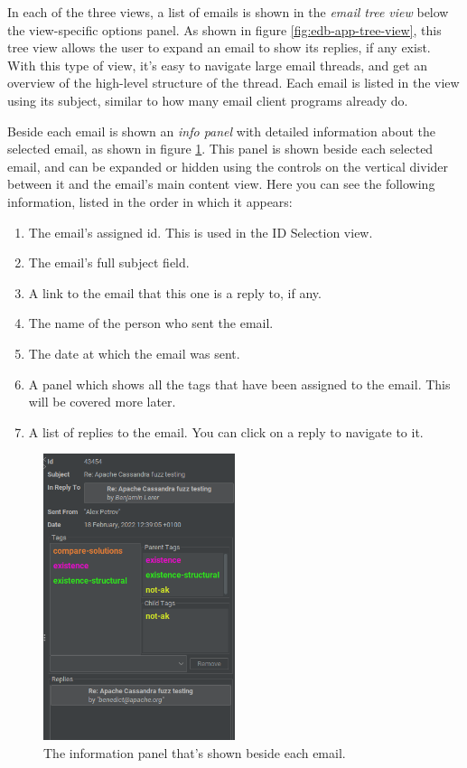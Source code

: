 \documentclass[a4paper, 12pt]{article}
\begin{document}
			In each of the three views, a list of emails is shown in the \textit{email tree view} below the view-specific options panel. As shown in figure \ref{fig:edb-app-tree-view}, this tree view allows the user to expand an email to show its replies, if any exist. With this type of view, it's easy to navigate large email threads, and get an overview of the high-level structure of the thread. Each email is listed in the view using its subject, similar to how many email client programs already do.
		
			Beside each email is shown an \textit{info panel} with detailed information about the selected email, as shown in figure \ref{fig:edb-app-info-panel}. This panel is shown beside each selected email, and can be expanded or hidden using the controls on the vertical divider between it and the email's main content view. Here you can see the following information, listed in the order in which it appears:
			
			\begin{enumerate}
				\item The email's assigned id. This is used in the ID Selection view.
				\item The email's full subject field.
				\item A link to the email that this one is a reply to, if any.
				\item The name of the person who sent the email.
				\item The date at which the email was sent.
				\item A panel which shows all the tags that have been assigned to the email. This will be covered more later.
				\item A list of replies to the email. You can click on a reply to navigate to it.
			\end{enumerate}
		
			\begin{figure}
				\includegraphics[width=0.5\textwidth]{img/edb-app_info-panel.png}
				\caption{The information panel that's shown beside each email.}
				\label{fig:edb-app-info-panel}
			\end{figure}
		
\end{document}
